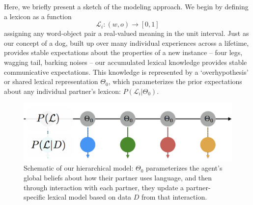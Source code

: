 \documentclass[12pt, donotrepeattitle, man, floatsintext]{apa6}
\begin{document}
Here, we briefly present a sketch of the modeling approach. We begin by defining a lexicon as a function $$\mathcal{L}_i: (w, o) \rightarrow [0,1]$$ assigning any word-object pair a real-valued meaning in the unit interval. Just as our concept of a dog, built up over many individual experiences across a lifetime, provides stable expectations about the properties of a new instance -- four legs, wagging tail, barking noises -- our accumulated lexical knowledge provides stable communicative expectations. 
This knowledge is represented by a `overhypothesis' or shared lexical representation $\Theta_0$, which parameterizes the prior expectations about any individual partner's lexicon: $P(\mathcal{L}_i | \Theta_0)$. 

\begin{figure}[b]
\centering
\includegraphics[scale=.4]{model_schematic.png}
\caption{Schematic of our hierarchical model: $\Theta_0$ parameterizes the agent's global beliefs about how their partner uses language, and then through interaction with each partner, they update a partner-specific lexical model based on data $D$ from that interaction.}
\label{fig:modelschematic}
\end{figure}
\end{document}
